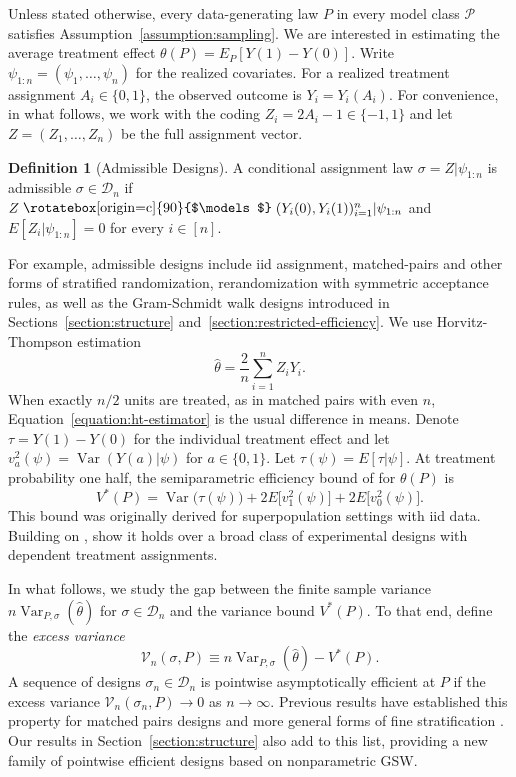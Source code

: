 \documentclass[letterpaper,12pt]{article}
\theoremstyle{definition}
\newtheorem{defn}[thm]{Definition}
\numberwithin{equation}{section}
\newcommand{\mc}{\mathcal}
\newcommand{\indep}{\mathrel{\raisebox{0.05em}{\rotatebox[origin=c]{90}{$\models$}}}}
\DeclareMathOperator{\var}{Var}
\begin{document}
Unless stated otherwise, every data-generating law $P$ in every model class $\mc P$ satisfies Assumption~\ref{assumption:sampling}.
We are interested in estimating the average treatment effect $\theta(P) = E_P[Y(1)-Y(0)]$.
Write $\psi_{1:n}=(\psi_1,\ldots,\psi_n)$ for the realized covariates.
For a realized treatment assignment $A_i\in\{0,1\}$, the observed outcome is $Y_i=Y_i(A_i)$.
For convenience, in what follows, we work with the coding $Z_i=2A_i-1\in\{-1,1\}$ and let $Z=(Z_1,\ldots,Z_n)$ be the full assignment vector.
\begin{defn}[Admissible Designs]\label{definition:admissible-designs}
A conditional assignment law $\sigma = Z | \psi_{1:n}$ is admissible $\sigma \in \mathcal D_n$ if $Z\indep(Y_i(0),Y_i(1))_{i=1}^n|\psi_{1:n}$ and $E[Z_i|\psi_{1:n}]=0$ for every $i\in[n]$.
\end{defn}

For example, admissible designs include iid assignment, matched-pairs and other forms of stratified randomization, rerandomization with symmetric acceptance rules, as well as the Gram-Schmidt walk designs introduced in Sections~\ref{section:structure} and~\ref{section:restricted-efficiency}.
We use Horvitz-Thompson estimation 
\begin{equation}\label{equation:ht-estimator}
\widehat\theta = \frac{2}{n}\sum_{i=1}^nZ_iY_i.
\end{equation}
When exactly $n/2$ units are treated, as in matched pairs with even $n$, Equation~\eqref{equation:ht-estimator} is the usual difference in means.
Denote $\tau=Y(1)-Y(0)$ for the individual treatment effect and let $v_a^2(\psi)=\var(Y(a)|\psi)$ for $a\in\{0,1\}$.
Let $\tau(\psi)=E[\tau|\psi]$. 
At treatment probability one half, the semiparametric efficiency bound of \citet{hahn1998} for $\theta(P)$ is 
\begin{equation}\label{equation:efficiency-bound}
V^*(P) = \var\bigl(\tau(\psi)\bigr) +2E\bigl[v_1^2(\psi)\bigr] +2E\bigl[v_0^2(\psi)\bigr].
\end{equation}
This bound was originally derived for superpopulation settings with iid data.
Building on \citet{armstrong2022}, \citet{bai2023efficiency} show it holds over a broad class of experimental designs with dependent treatment assignments.

In what follows, we study the gap between the finite sample variance $n\var_{P,\sigma}(\widehat\theta)$ for $\sigma \in \mc D_n$ and the variance bound $V^*(P)$.
To that end, define the \emph{excess variance} 
\begin{equation}\label{equation:excess-variance}
\mc V_n(\sigma,P)\equiv n\var_{P,\sigma}(\widehat\theta)-V^*(P).
\end{equation}
A sequence of designs $\sigma_n \in \mc D_n$ is pointwise asymptotically efficient at $P$ if the excess variance $\mc V_n(\sigma_n,P)\to0$ as $n \to \infty$.
Previous results have established this property for matched pairs designs and more general forms of fine stratification \citep{bai2021inference,bai2023efficiency,cytrynbaum2022local}.
Our results in Section~\ref{section:structure} also add to this list, providing a new family of pointwise efficient designs based on nonparametric GSW.
\end{document}
